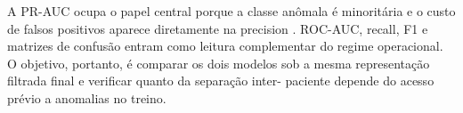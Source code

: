 A PR-AUC ocupa o papel central porque a classe anômala é minoritária e o custo
de falsos positivos aparece diretamente na precision \citep{davis2006prroc}.
ROC-AUC, recall, F1 e matrizes de confusão entram como leitura complementar do
regime operacional. O objetivo, portanto, é comparar os dois modelos sob a
mesma representação filtrada final e verificar quanto da separação inter-
paciente depende do acesso prévio a anomalias no treino.
